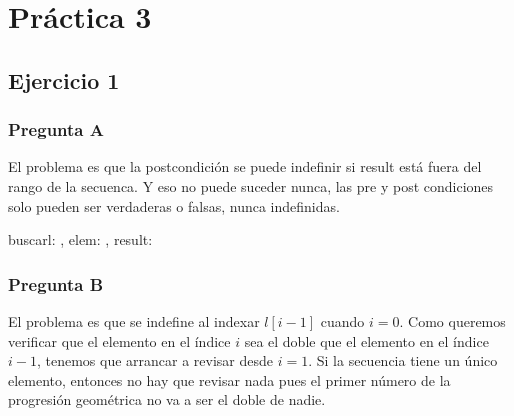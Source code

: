 
\usepackage{caratula}
\usepackage{enumerate}
\usepackage{hyperref}

\decimalpoint
\hypersetup{colorlinks=true, linkcolor=black, urlcolor=blue}
\setlength{\parindent}{0em}
\setlength{\parskip}{0.5em}
\setcounter{tocdepth}{2}
\setcounter{section}{2}
\renewcommand{\thesubsubsection}{\thesubsection.\Alph{subsubsection}}




\maketitle

\tableofcontents
\newpage

\section{Práctica 3}

\subsection{Ejercicio 1}

\subsubsection{Pregunta A}

El problema es que la postcondición se puede indefinir si result está fuera del rango de la secuenca. Y eso no puede suceder nunca, las pre y post condiciones solo pueden ser verdaderas o falsas, nunca indefinidas.

\begin{proc}{buscar}{\In l: \TLista{\float}, \In elem: \float, \Out result: \ent}{}
\end{proc}

\subsubsection{Pregunta B}

El problema es que se indefine al indexar $l[i-1]$ cuando $i=0$. Como queremos verificar que el elemento en el índice $i$ sea el doble que el elemento en el índice $i-1$, tenemos que arrancar a revisar desde $i=1$. Si la secuencia tiene un único elemento, entonces no hay que revisar nada pues el primer número de la progresión geométrica no va a ser el doble de nadie.

